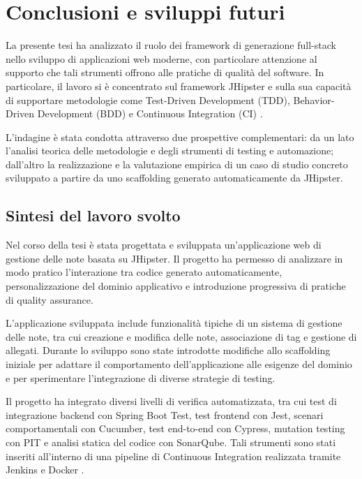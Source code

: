 
\chapter{Conclusioni e sviluppi futuri}
\label{cap:conclusions}

La presente tesi ha analizzato il ruolo dei framework di generazione full-stack nello sviluppo di applicazioni web moderne, con particolare attenzione al supporto che tali strumenti offrono alle pratiche di qualità del software. In particolare, il lavoro si è concentrato sul framework JHipster e sulla sua capacità di supportare metodologie come Test-Driven Development (TDD), Behavior-Driven Development (BDD) e Continuous Integration (CI) \cite{Beck2002,North2006,Fowler2006CI,JHipsterDocs}.

L'indagine è stata condotta attraverso due prospettive complementari: da un lato l'analisi teorica delle metodologie e degli strumenti di testing e automazione; dall'altro la realizzazione e la valutazione empirica di un caso di studio concreto sviluppato a partire da uno scaffolding generato automaticamente da JHipster.

\section{Sintesi del lavoro svolto}

Nel corso della tesi è stata progettata e sviluppata un'applicazione web di gestione delle note basata su JHipster. Il progetto ha permesso di analizzare in modo pratico l'interazione tra codice generato automaticamente, personalizzazione del dominio applicativo e introduzione progressiva di pratiche di quality assurance.

L'applicazione sviluppata include funzionalità tipiche di un sistema di gestione delle note, tra cui creazione e modifica delle note, associazione di tag e gestione di allegati. Durante lo sviluppo sono state introdotte modifiche allo scaffolding iniziale per adattare il comportamento dell'applicazione alle esigenze del dominio e per sperimentare l'integrazione di diverse strategie di testing.

Il progetto ha integrato diversi livelli di verifica automatizzata, tra cui test di integrazione backend con Spring Boot Test, test frontend con Jest, scenari comportamentali con Cucumber, test end-to-end con Cypress, mutation testing con PIT e analisi statica del codice con SonarQube. Tali strumenti sono stati inseriti all'interno di una pipeline di Continuous Integration realizzata tramite Jenkins e Docker \cite{CucumberDocs,CypressDocs,PITDocs,SonarQubeDocs,JenkinsDocs,DockerDocs}.

